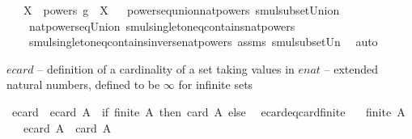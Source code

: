 \begin{isabellebody}
\ \ \ {\isachardoublequoteopen}X\ {\isasymcdots}\ {\isacharparenleft}{\kern0pt}powers\ g{\isacharparenright}{\kern0pt}\ {\isacharequal}{\kern0pt}\ X{\isachardoublequoteclose}%
\isadelimproof
\ %
\endisadelimproof
%
\isatagproof
{}\isamarkupfalse%
\ powers{\isacharunderscore}{\kern0pt}eq{\isacharunderscore}{\kern0pt}union{\isacharunderscore}{\kern0pt}nat{\isacharunderscore}{\kern0pt}powers\ smul{\isacharunderscore}{\kern0pt}subset{\isacharunderscore}{\kern0pt}Union{}\ \isanewline
\ \ \ \ nat{\isacharunderscore}{\kern0pt}powers{\isacharunderscore}{\kern0pt}eq{\isacharunderscore}{\kern0pt}Union\ smul{\isacharunderscore}{\kern0pt}singleton{\isacharunderscore}{\kern0pt}eq{\isacharunderscore}{\kern0pt}contains{\isacharunderscore}{\kern0pt}nat{\isacharunderscore}{\kern0pt}powers\ \isanewline
\ \ \ \ smul{\isacharunderscore}{\kern0pt}singleton{\isacharunderscore}{\kern0pt}eq{\isacharunderscore}{\kern0pt}contains{\isacharunderscore}{\kern0pt}inverse{\isacharunderscore}{\kern0pt}nat{\isacharunderscore}{\kern0pt}powers\ assms\ smul{\isacharunderscore}{\kern0pt}subset{\isacharunderscore}{\kern0pt}Un{}\ \isamarkupfalse%
\ auto%
\endisatagproof
{\isafoldproof}%
%
\isadelimproof
%
\endisadelimproof
\isanewline
\isanewline
{}\isamarkupfalse%
%
\isadelimdocument
%
\endisadelimdocument
%
\isatagdocument
%
\isamarkuptrue%
%
\endisatagdocument
{\isafolddocument}%
%
\isadelimdocument
%
\endisadelimdocument
%
\begin{isamarkuptext}%
$ecard$ -- definition of a cardinality of a set taking values in $enat$ -- extended natural numbers, defined to be $\infty$ for infinite sets%
\end{isamarkuptext}\isamarkuptrue%
\isamarkupfalse%
\ ecard\ \ {\isachardoublequoteopen}ecard\ A\ {\isacharequal}{\kern0pt}\ {\isacharparenleft}{\kern0pt}if\ finite\ A\ then\ card\ A\ else\ {\isasyminfinity}{\isacharparenright}{\kern0pt}{\isachardoublequoteclose}\isanewline
\isanewline
{}\isamarkupfalse%
\ ecard{\isacharunderscore}{\kern0pt}eq{\isacharunderscore}{\kern0pt}card{\isacharunderscore}{\kern0pt}finite{\isacharcolon}{\kern0pt}\isanewline
\ \ \ {\isachardoublequoteopen}finite\ A{\isachardoublequoteclose}\isanewline
\ \ \ {\isachardoublequoteopen}ecard\ A\ {\isacharequal}{\kern0pt}\ card\ A{\isachardoublequoteclose}\ \isanewline
%
\isadelimproof
\ \ %
\endisadelimproof

\end{isabellebody}

